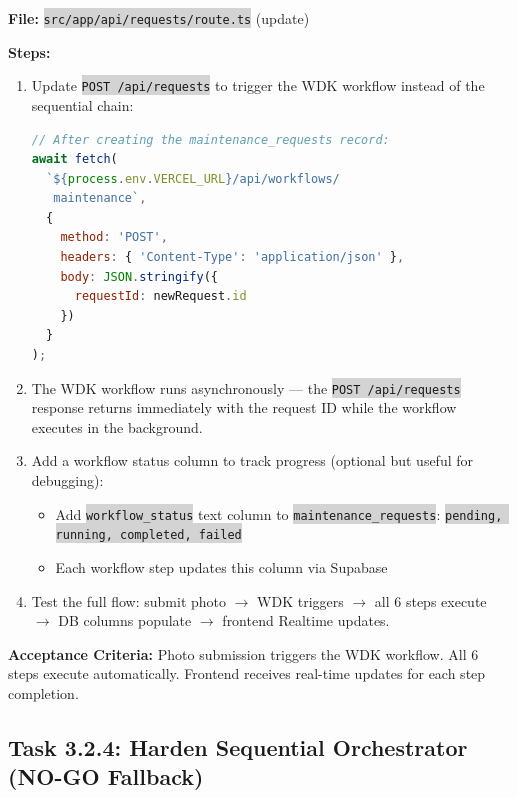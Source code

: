 \documentclass[11pt, a4paper]{article}
\newcommand{\code}[1]{\texttt{\small\colorbox{lightgray}{#1}}}
\begin{document}
\vspace{0.3em}

\textbf{File:} \code{src/app/api/requests/route.ts} (update)

\textbf{Steps:}
\begin{enumerate}[leftmargin=2em, itemsep=2pt]
  \item Update \code{POST /api/requests} to trigger the WDK workflow instead of the sequential chain:
\begin{lstlisting}[language=JavaScript]
// After creating the maintenance_requests record:
await fetch(
  `${process.env.VERCEL_URL}/api/workflows/
   maintenance`,
  {
    method: 'POST',
    headers: { 'Content-Type': 'application/json' },
    body: JSON.stringify({ 
      requestId: newRequest.id 
    })
  }
);
\end{lstlisting}

  \item The WDK workflow runs asynchronously --- the \code{POST /api/requests} response returns immediately with the request ID while the workflow executes in the background.

  \item Add a workflow status column to track progress (optional but useful for debugging):
    \begin{itemize}[itemsep=1pt]
      \item Add \code{workflow\_status} text column to \code{maintenance\_requests}: \code{pending, running, completed, failed}
      \item Each workflow step updates this column via Supabase
    \end{itemize}

  \item Test the full flow: submit photo $\rightarrow$ WDK triggers $\rightarrow$ all 6 steps execute $\rightarrow$ DB columns populate $\rightarrow$ frontend Realtime updates.
\end{enumerate}

\textbf{Acceptance Criteria:} Photo submission triggers the WDK workflow. All 6 steps execute automatically. Frontend receives real-time updates for each step completion.

\vspace{1em}

\subsection{Task 3.2.4: Harden Sequential Orchestrator (NO-GO Fallback)}
\end{document}
